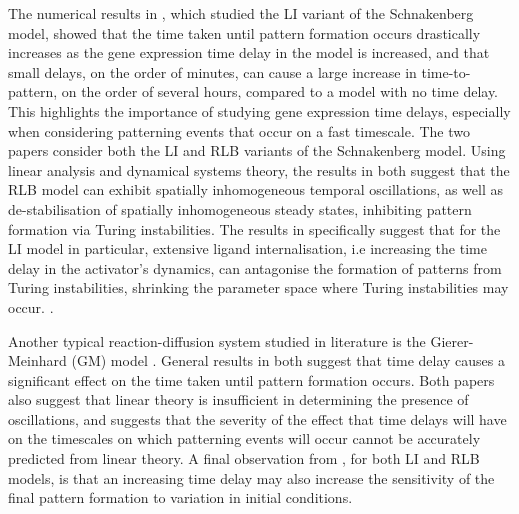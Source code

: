 The numerical results in \cite{gaffmonk}, which studied the LI variant of the Schnakenberg model, showed that the time taken until pattern formation occurs drastically increases as the gene expression time delay in the model is increased, and that small delays, on the order of minutes, can cause a large increase in time-to-pattern, on the order of several hours, compared to a model with no time delay. This highlights the importance of studying gene expression time delays, especially when considering patterning events that occur on a fast timescale. The two papers \cite{jiang, yigaffneyli} consider both the LI and RLB variants of the Schnakenberg model. Using linear analysis and dynamical systems theory, the results in both suggest that the RLB model can exhibit spatially inhomogeneous temporal oscillations, as well as de-stabilisation of spatially inhomogeneous steady states, inhibiting pattern formation via Turing instabilities. The results in \cite{yigaffneyli}  specifically suggest that for the LI model in particular, extensive ligand internalisation, i.e increasing the time delay in the activator's dynamics, can antagonise the formation of patterns from Turing instabilities, shrinking the parameter space where Turing instabilities may occur. .

Another typical reaction-diffusion system studied in  literature is the Gierer-Meinhard (GM) model \cite{gm}. General results in both \cite{leegaffney,leegaffmonk} suggest that time delay causes a significant effect on the time taken until pattern formation occurs. Both papers also suggest that linear theory is insufficient in determining the presence of oscillations, and \cite{leegaffmonk} suggests that the severity of the effect that time delays will have on the timescales on which patterning events will occur cannot be accurately predicted from linear theory. A final observation from \cite{gaffmonk,leegaffmonk}, for both LI and RLB models, is that an increasing time delay may also increase the sensitivity of the final pattern formation to variation in initial conditions.

